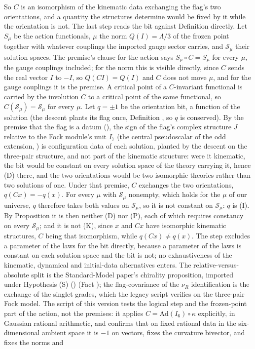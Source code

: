 So $C$ is an isomorphism of the kinematic data exchanging the flag's two orientations, and a quantity the structures determine would be fixed by it while the orientation is not. The last step reads the bit against Definition  directly. Let $S_{\mu}$ be the action functionals, $\mu$ the norm $Q(I) = \Lambda/3$ of the frozen point together with whatever couplings the imported gauge sector carries, and $\mathcal{S}_{\mu}$ their solution spaces. The premise's clause for the action says $S_{\mu} \circ C = S_{\mu}$ for every $\mu$, the gauge couplings included; for the norm this is visible directly, since $C$ sends the real vector $I$ to $-I$, so $Q(CI) = Q(I)$ and $C$ does not move $\mu$, and for the gauge couplings it is the premise. A critical point of a $C$-invariant functional is carried by the involution $C$ to a critical point of the same functional, so $C(\mathcal{S}_{\mu}) = \mathcal{S}_{\mu}$ for every $\mu$. Let $q = \pm 1$ be the orientation bit, a function of the solution (the descent plants its flag once, Definition , so $q$ is conserved). By the premise that the flag is a datum (), the sign of the flag's complex structure $J$ relative to the Fock module's unit $I_7$ (the central pseudoscalar of the odd extension, ) is configuration data of each solution, planted by the descent on the three-pair structure, and not part of the kinematic structure: were it kinematic, the bit would be constant on every solution space of the theory carrying it, hence (D) there, and the two orientations would be two isomorphic theories rather than two solutions of one. Under that premise, $C$ exchanges the two orientations, $q(Cx) = -q(x)$. For every $\mu$ with $\mathcal{S}_{\mu}$ nonempty, which holds for the $\mu$ of our universe, $q$ therefore takes both values on $\mathcal{S}_{\mu}$, so it is not constant on $\mathcal{S}_{\mu}$: $q$ is (I). By Proposition  it is then neither (D) nor (P), each of which requires constancy on every $\mathcal{S}_{\mu}$; and it is not (K), since $x$ and $Cx$ have isomorphic kinematic structures, $C$ being that isomorphism, while $q(Cx) \neq q(x)$. The step excludes a parameter of the laws for the bit directly, because a parameter of the laws is constant on each solution space and the bit is not; no exhaustiveness of the kinematic, dynamical and initial-data alternatives enters. The relative-versus-absolute split is the Standard-Model paper's chirality proposition, imported under Hypothesis (S) () (Fact ); the flag-covariance of the $\nu_{R}$ identification is the exchange of the singlet grades, which the legacy script verifies on the three-pair Fock model. The script of this version tests the logical step and the frozen-point part of the action, not the premises: it applies $C = \mathrm{Ad}(I_{6}) \circ \kappa$ explicitly, in Gaussian rational arithmetic, and confirms that on fixed rational data in the six-dimensional ambient space it is $-1$ on vectors, fixes the curvature bivector, and fixes the norms and 